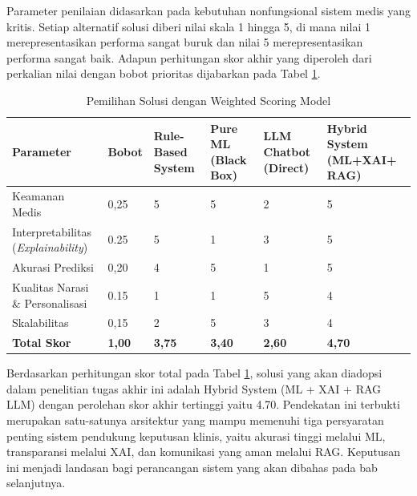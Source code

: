 Parameter penilaian didasarkan pada kebutuhan nonfungsional sistem medis yang kritis. Setiap alternatif solusi diberi nilai skala 1 hingga 5, di mana nilai 1 merepresentasikan performa sangat buruk dan nilai 5 merepresentasikan performa sangat baik. Adapun perhitungan skor akhir yang diperoleh dari perkalian nilai dengan bobot prioritas dijabarkan pada Tabel \ref{tab:pemilihan-solusi}.

\begin{table}[H]
    \caption{Pemilihan Solusi dengan Weighted Scoring Model}
    \label{tab:pemilihan-solusi}
    \centering
    \small
    \begin{tabular}{|p{3.5cm}|p{1cm}|p{2cm}|p{2cm}|p{2cm}|p{2.5cm}|}
        \hline
        \textbf{Parameter} & \textbf{Bobot} & \textbf{Rule-Based System} & \textbf{Pure ML (Black Box)} & \textbf{LLM Chatbot (Direct)} & \textbf{Hybrid System (ML+XAI+ RAG)} \\
        \hline
        Keamanan Medis & 0,25 & 5 & 5 & 2 & 5 \\
        \hline
        Interpretabilitas (\textit{Explainability}) & 0.25 & 5 & 1 & 3 & 5 \\
        \hline
        Akurasi Prediksi  & 0,20 & 4 & 5 & 1 & 5 \\
        \hline
        Kualitas Narasi \& Personalisasi & 0.15 & 1 & 1 & 5 & 4 \\
        \hline
        Skalabilitas & 0,15 & 2 & 5 & 3 & 4 \\
        \hline
        \textbf{Total Skor} & \textbf{1,00} & \textbf{3,75} & \textbf{3,40} & \textbf{2,60} & \textbf{4,70} \\
        \hline
    \end{tabular}
\end{table}

Berdasarkan perhitungan skor total pada Tabel \ref{tab:pemilihan-solusi}, solusi yang akan diadopsi dalam penelitian tugas akhir ini adalah Hybrid System (ML + XAI + RAG LLM) dengan perolehan skor akhir tertinggi yaitu 4.70. Pendekatan ini terbukti merupakan satu-satunya arsitektur yang mampu memenuhi tiga persyaratan penting sistem pendukung keputusan klinis, yaitu akurasi tinggi melalui ML, transparansi melalui XAI, dan komunikasi yang aman melalui RAG. Keputusan ini menjadi landasan bagi perancangan sistem yang akan dibahas pada bab selanjutnya.